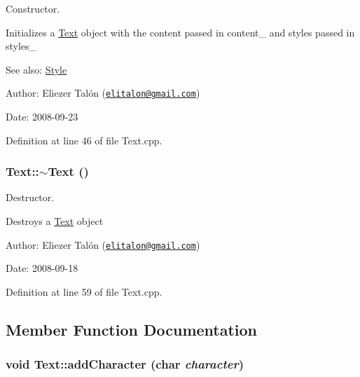 Constructor. 

Initializes a \hyperlink{class_text}{Text} object with the content passed in content\_\- and styles passed in styles\_\-

\begin{Desc}
\item[See also:]\hyperlink{class_style}{Style}\end{Desc}
\begin{Desc}
\item[Author:]Eliezer Talón (\href{mailto:elitalon@gmail.com}{\tt elitalon@gmail.com}) \end{Desc}
\begin{Desc}
\item[Date:]2008-09-23 \end{Desc}


Definition at line 46 of file Text.cpp.\hypertarget{class_text_2d49e5c280e205125b149f7777ae30c7}{
\subsubsection[$\sim$Text]{\setlength{\rightskip}{0pt plus 5cm}Text::$\sim$Text ()}}
\label{class_text_2d49e5c280e205125b149f7777ae30c7}


Destructor. 

Destroys a \hyperlink{class_text}{Text} object

\begin{Desc}
\item[Author:]Eliezer Talón (\href{mailto:elitalon@gmail.com}{\tt elitalon@gmail.com}) \end{Desc}
\begin{Desc}
\item[Date:]2008-09-18 \end{Desc}


Definition at line 59 of file Text.cpp.

\subsection{Member Function Documentation}
\hypertarget{class_text_f30df66d8aa08a4e202512a358534f6c}{
\subsubsection[addCharacter]{\setlength{\rightskip}{0pt plus 5cm}void Text::addCharacter (char {\em character})}}
\label{class_text_f30df66d8aa08a4e202512a358534f6c}


